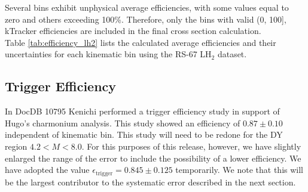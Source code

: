 \documentclass[11pt]{article}
\begin{document}



\clearpage
\FloatBarrier
Several bins exhibit unphysical average efficiencies, with some values equal to zero and others exceeding 100\%. Therefore, only the bins with valid (0, 100], kTracker efficiencies are included in the final cross section calculation.
\\

Table \ref{tab:efficiency_lh2} lists the calculated average efficiencies and their uncertainties for each kinematic bin using the RS-67 LH$_2$ dataset.



\subsection{Trigger Efficiency}

In DocDB 10795 Kenichi performed a trigger efficiency study in support of Hugo's charmonium analysis.  This study showed an efficiency of $0.87 \pm 0.10$ independent of kinematic bin.  This study will need to be redone for the DY region $4.2<M<8.0$.  For this purposes of this release, however, we have slightly enlarged the range of the error to include the possibility of a lower efficiency.  We have adopted the value $\epsilon_{\text{trigger}} = 0.845 \pm 0.125$ temporarily.  We note that this will be the largest contributor to the systematic error described in the next section.
\end{document}
